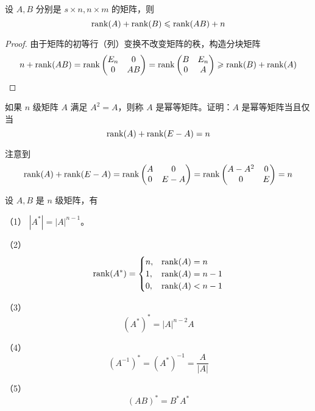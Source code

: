 \begin{theorem}
	设 $A, B$ 分别是 $s \times n, n \times m$ 的矩阵，则
	\[ \operatorname{rank}(A) + \operatorname{rank}(B) \leqslant \operatorname{rank}(AB) + n \]
\end{theorem}

\begin{proof}
	由于矩阵的初等行（列）变换不改变矩阵的秩，构造分块矩阵
	\[ n + \operatorname{rank}(AB) = \operatorname{rank} \left(\begin{matrix}
				E_n & 0 \\ 0 & AB
			\end{matrix}\right) = \operatorname{rank}\left(\begin{matrix}
				B & E_n \\ 0 & A
			\end{matrix}\right) \geqslant \operatorname{rank}(B) + \operatorname{rank}(A) \]
\end{proof}

\begin{example}
	如果 $n$ 级矩阵 $A$ 满足 $A^2 = A$，则称 $A$ 是幂等矩阵。证明：$A$ 是幂等矩阵当且仅当
	\[ \operatorname{rank}(A) + \operatorname{rank}(E - A) = n \]
\end{example}

\begin{solution}
	注意到
	\[ \operatorname{rank}(A) + \operatorname{rank}(E - A) = \operatorname{rank}\left(\begin{matrix}
				A & 0 \\ 0 & E - A
			\end{matrix}\right) = \operatorname{rank}\left(\begin{matrix}
				A - A^2 & 0 \\ 0 & E
			\end{matrix}\right) = n \]
\end{solution}

\begin{example}
	设 $A, B$ 是 $n$ 级矩阵，有
	
	（1） $|A^*| = |A|^{n-1}$。
	
	（2） \[ \operatorname{rank}(A^*) = \begin{cases}
			n, & \operatorname{rank}(A) = n      \\
			1, & \operatorname{rank}(A) = n - 1  \\
			0, & \operatorname{rank}(A) < n - 1
		\end{cases} \]
	
	（3）\[ (A^*)^* = |A|^{n-2} A \]
	
	（4）\[ (A^{-1})^{*} = (A^*)^{-1} = \frac{A}{|A|} \]
	
	（5）\[ (AB)^* = B^*A^* \]
\end{example}


